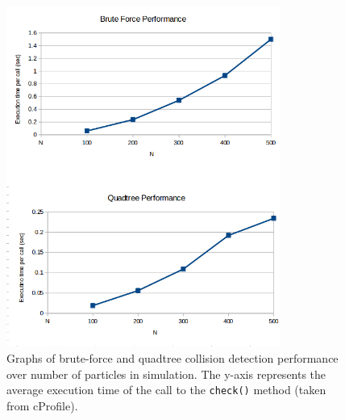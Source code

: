       \begin{figure}
	\centering
	\includegraphics[width=0.8\textwidth]{./img/graphs}
	\caption{Graphs of brute-force and quadtree collision detection
	performance over number of particles in simulation. The y-axis
	represents the average execution time of the call to the
	\texttt{check()} method (taken from cProfile).}
	\label{figure:graphs}
      \end{figure}

    \newpage
